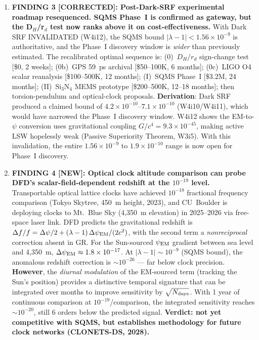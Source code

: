 \documentclass[11pt]{article}
\newcommand{\ee}[1]{\times 10^{#1}}
\newcommand{\lbone}{|\lambda - 1|}
\begin{document}
\begin{tcolorbox}[colback=blue!5!white, colframe=blue!60!black,
  title=\textbf{W4i13 TOP 5 FINDINGS --- Ranked by Programme Impact}]
\begin{enumerate}
\item \textbf{FINDING 3 [CORRECTED]: Post-Dark-SRF experimental roadmap
resequenced. SQMS Phase~I is confirmed as gateway, but the D$_H$/r$_d$
test now ranks above it on cost-effectiveness.}
With Dark SRF INVALIDATED (W4i12), the SQMS bound $\lbone < 1.56\ee{-9}$
is authoritative, and the Phase~I discovery window is \emph{wider} than
previously estimated. The recalibrated optimal sequence is:
(0)~$D_H/r_d$ sign-change test [\$0, 2 weeks];
(0b)~GPS 59~ps archival [\$50--100K, 6 months];
(0c)~LIGO O4 scalar reanalysis [\$100--500K, 12 months];
(I)~SQMS Phase~I [\$3.2M, 24 months];
(II)~Si$_3$N$_4$ MEMS prototype [\$200--500K, 12--18 months];
then torsion-pendulum and optical-clock proposals.
\textbf{Derivation}: Dark SRF produced a claimed bound of
$4.2\ee{-10}$--$7.1\ee{-10}$ (W4i10/W4i11), which would have narrowed
the Phase~I discovery window. W4i12 shows the EM-to-$\psi$ conversion
uses gravitational coupling $G/c^4 = 9.3\ee{-45}$, making active LSW
hopelessly weak (Passive Superiority Theorem, W3i5). With this
invalidation, the entire $1.56\ee{-9}$ to $1.9\ee{-10}$ range is
now open for Phase~I discovery.

\item \textbf{FINDING 4 [NEW]: Optical clock altitude comparison can
probe DFD's scalar-field-dependent redshift at the $10^{-19}$ level.}
Transportable optical lattice clocks have achieved $10^{-18}$ fractional
frequency comparison (Tokyo Skytree, 450~m height, 2023), and CU~Boulder
is deploying clocks to Mt.~Blue Sky (4,350~m elevation) in 2025--2026
via free-space laser link. DFD predicts the gravitational redshift is
$\Delta f/f = \Delta\psi/2 + (\lambda-1)\,\Delta\psi_{\rm EM}/(2c^2)$,
with the second term a \emph{nonreciprocal} correction absent in GR.
For the Sun-sourced $\psi_{\rm EM}$ gradient between sea level and
4,350~m, $\Delta\psi_{\rm EM} \approx 1.8\ee{-17}$.
At $\lbone \sim 10^{-9}$ (SQMS bound), the anomalous redshift correction
is $\sim 10^{-26}$ --- far below clock precision. \textbf{However}, the
\emph{diurnal modulation} of the EM-sourced term (tracking the Sun's
position) provides a distinctive temporal signature that can be
integrated over months to improve sensitivity by $\sqrt{N_{\rm days}}$.
With 1 year of continuous comparison at $10^{-19}$/comparison,
the integrated sensitivity reaches $\sim 10^{-20}$, still 6 orders
below the predicted signal. \textbf{Verdict: not yet competitive with
SQMS, but establishes methodology for future clock networks
(CLONETS-DS, 2028).}


\end{enumerate}
\end{tcolorbox}
\end{document}
